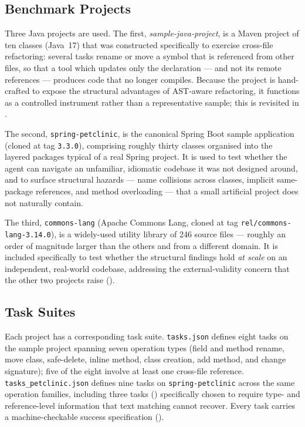 \subsection{Benchmark Projects}
Three Java projects are used. The first, \emph{sample-java-project}, is a Maven
project of ten classes (Java~17) that was constructed specifically to exercise
cross-file refactoring: several tasks rename or move a symbol that is referenced
from other files, so that a tool which updates only the declaration --- and not
its remote references --- produces code that no longer compiles. Because the
project is hand-crafted to expose the structural advantages of AST-aware
refactoring, it functions as a controlled instrument rather than a representative
sample; this is revisited in .

The second, \texttt{spring-petclinic}, is the canonical Spring Boot sample
application (cloned at tag \texttt{3.3.0}), comprising roughly thirty classes
organised into the layered packages typical of a real Spring project. It is used
to test whether the agent can navigate an unfamiliar, idiomatic codebase it was
not designed around, and to surface structural hazards --- name collisions across
classes, implicit same-package references, and method overloading --- that a
small artificial project does not naturally contain.

The third, \texttt{commons-lang} (Apache Commons Lang, cloned at tag
\texttt{rel/commons-lang-3.14.0}), is a widely-used utility library of 246
source files --- roughly an order of magnitude larger than the others and from a
different domain. It is included specifically to test whether the structural
findings hold \emph{at scale} on an independent, real-world codebase, addressing
the external-validity concern that the other two projects raise
().

\subsection{Task Suites}
Each project has a corresponding task suite. \texttt{tasks.json} defines eight
tasks on the sample project spanning seven operation types (field and method
rename, move class, safe-delete, inline method, class creation, add method, and
change signature); five of the eight involve at least one cross-file reference.
\texttt{tasks\_petclinic.json} defines nine tasks on \texttt{spring-petclinic}
across the same operation families, including three tasks
() specifically chosen to require type- and
reference-level information that text matching cannot recover. Every task carries
a machine-checkable success specification ().

